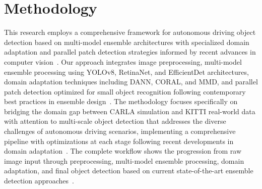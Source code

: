 \documentclass[conference]{IEEEtran}
\begin{document}
\section{Methodology}
This research employs a comprehensive framework for autonomous driving object detection based on multi-model ensemble architectures with specialized domain adaptation and parallel patch detection strategies informed by recent advances in computer vision~\cite{wang2024efficient}.
Our approach integrates image preprocessing, multi-model ensemble processing using YOLOv8, RetinaNet, and EfficientDet architectures, domain adaptation techniques including DANN, CORAL, and MMD, and parallel patch detection optimized for small object recognition following contemporary best practices in ensemble design~\cite{zhao2024temporal}.
The methodology focuses specifically on bridging the domain gap between CARLA simulation and KITTI real-world data with attention to multi-scale object detection that addresses the diverse challenges of autonomous driving scenarios, implementing a comprehensive pipeline with optimizations at each stage following recent developments in domain adaptation~\cite{chen2024neural}.
The complete workflow shows the progression from raw image input through preprocessing, multi-model ensemble processing, domain adaptation, and final object detection based on current state-of-the-art ensemble detection approaches~\cite{huang2024hybrid}.
\end{document}
